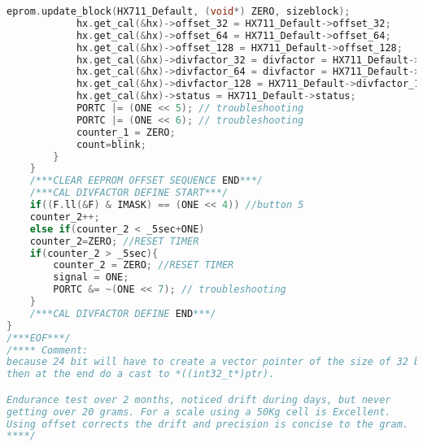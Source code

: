 \begin{lstlisting}[language=C, caption={main.c}, label=main-c, captionpos=b]
			eprom.update_block(HX711_Default, (void*) ZERO, sizeblock);
			hx.get_cal(&hx)->offset_32 = HX711_Default->offset_32;
			hx.get_cal(&hx)->offset_64 = HX711_Default->offset_64;
			hx.get_cal(&hx)->offset_128 = HX711_Default->offset_128;
			hx.get_cal(&hx)->divfactor_32 = divfactor = HX711_Default->divfactor_32;
			hx.get_cal(&hx)->divfactor_64 = divfactor = HX711_Default->divfactor_64;
			hx.get_cal(&hx)->divfactor_128 = HX711_Default->divfactor_128;
			hx.get_cal(&hx)->status = HX711_Default->status;
			PORTC |= (ONE << 5); // troubleshooting
			PORTC |= (ONE << 6); // troubleshooting
			counter_1 = ZERO;
			count=blink;
		}
	}
	/***CLEAR EEPROM OFFSET SEQUENCE END***/
	/***CAL DIVFACTOR DEFINE START***/
	if((F.ll(&F) & IMASK) == (ONE << 4)) //button 5
	counter_2++;
	else if(counter_2 < _5sec+ONE)
	counter_2=ZERO; //RESET TIMER
	if(counter_2 > _5sec){
		counter_2 = ZERO; //RESET TIMER
		signal = ONE;
		PORTC &= ~(ONE << 7); // troubleshooting
	}
	/***CAL DIVFACTOR DEFINE END***/
}
/***EOF***/
/**** Comment:
because 24 bit will have to create a vector pointer of the size of 32 bit,
then at the end do a cast to *((int32_t*)ptr).

Endurance test over 2 months, noticed drift during days, but never
getting over 20 grams. For a scale using a 50Kg cell is Excellent.
Using offset corrects the drift and precision is concise to the gram.
****/
\end{lstlisting}

